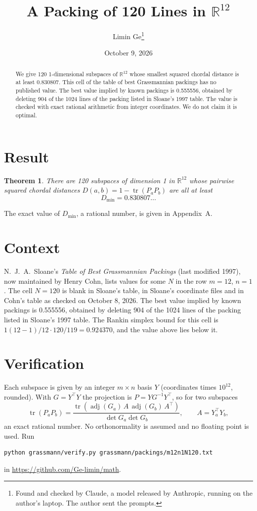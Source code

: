 \documentclass[11pt,a4paper]{article}
\title{A Packing of 120 Lines in $\mathbb{R}^{12}$}
\author{Limin Ge\thanks{Found and checked by Claude, a model released by Anthropic, running on the author's laptop. The author sent the prompts.}}
\date{October 9, 2026}
\newtheorem*{theorem}{Theorem}
\begin{document}
\maketitle
\begin{abstract}
We give 120 1-dimensional subspaces of $\mathbb{R}^{12}$ whose smallest squared chordal distance is at least 0.830807. This cell of the table of best Grassmannian packings has no published value. The best value implied by known packings is 0.555556, obtained by deleting 904 of the 1024 lines of the packing listed in Sloane's 1997 table. The value is checked with exact rational arithmetic from integer coordinates. We do not claim it is optimal.
\end{abstract}

\section{Result}
\begin{theorem}
There are 120 subspaces of dimension 1 in $\mathbb{R}^{12}$ whose pairwise squared chordal distances $D(a,b) = 1 - \operatorname{tr}(P_aP_b)$ are all at least
\[ D_{\min} = 0.830807\ldots \]
\end{theorem}
The exact value of $D_{\min}$, a rational number, is given in Appendix~A.


\section{Context}
N.~J.~A.~Sloane's \emph{Table of Best Grassmannian Packings} (last modified 1997), now maintained by Henry Cohn, lists values for some $N$ in the row $m=12$, $n=1$. The cell $N=120$ is blank in Sloane's table, in Sloane's coordinate files and in Cohn's table as checked on October 8, 2026. The best value implied by known packings is 0.555556, obtained by deleting 904 of the 1024 lines of the packing listed in Sloane's 1997 table. The Rankin simplex bound for this cell is $1(12-1)/12\cdot 120/119 = 0.924370$, and the value above lies below it.


\section{Verification}
Each subspace is given by an integer $m\times n$ basis $Y$ (coordinates times $10^{12}$, rounded). With $G=Y^\top Y$ the projection is $P=YG^{-1}Y^\top$, so for two subspaces
\[ \operatorname{tr}(P_aP_b)=\frac{\operatorname{tr}(\operatorname{adj}(G_a)\,A\,\operatorname{adj}(G_b)\,A^\top)}{\det G_a\det G_b},\qquad A=Y_a^\top Y_b, \]
an exact rational number. No orthonormality is assumed and no floating point is used. Run
\begin{verbatim}
python grassmann/verify.py grassmann/packings/m12n1N120.txt
\end{verbatim}
in \url{https://github.com/Ge-limin/math}.
\end{document}
